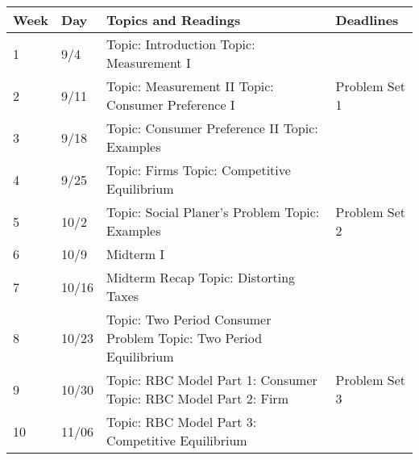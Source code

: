 \documentclass[12pt]{article}
\begin{document}
\newlength\bb
\setlength{}
\newlength\qq
\setlength{}
\newlength\rr
\setlength{}
\newlength\pp
\setlength{}
\begin{tabular}{|p{\bb}|p{\bb}|p{\pp}|p{\rr}|}
    \hline
        Week & Day & Topics and Readings & Deadlines \\
    \hline
    \hline
        1
        &
        9/4
        &
        Topic: Introduction
        \newline
        Topic: Measurement I
        &
    \\
    \hline
        2
        &
        9/11
        &
        Topic: Measurement II
        \newline
        Topic: Consumer Preference I
        &
        Problem Set 1
    \\
    \hline
        3
        &
        9/18
        &
        Topic: Consumer Preference II
        \newline
        Topic: Examples
        &
    \\
    \hline
        4
        &
        9/25
        &
        Topic: Firms
        \newline
        Topic: Competitive Equilibrium
        &
    \\
    \hline
        5
        &
        10/2
        &
        Topic: Social Planer's Problem
        \newline
        Topic: Examples
        &
        Problem Set 2
    \\
    \hline
        6
        &
        10/9
        &
        Midterm I
        &
    \\
    \hline
        7
        &
        10/16
        &
        Midterm Recap
        \newline
        Topic: Distorting Taxes
        &
    \\
    \hline
        8
        &
        10/23
        &
        Topic: Two Period Consumer Problem
        \newline
        Topic: Two Period Equilibrium
        &
    \\
    \hline
        9
        &
        10/30
        &
        Topic: RBC Model Part 1: Consumer
        \newline
        Topic: RBC Model Part 2: Firm
        &
        Problem Set 3
    \\
    \hline
        10
        &
        11/06
        &
        Topic: RBC Model Part 3: Competitive Equilibrium

\end{tabular}
\end{document}
